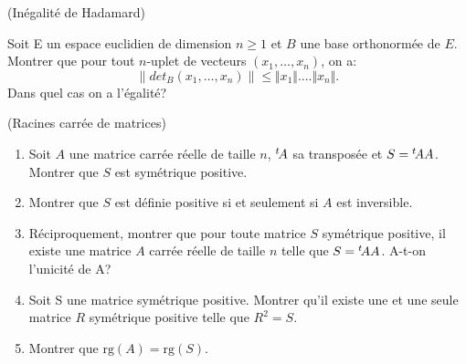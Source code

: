 \documentclass[a4paper,12pt,reqno]{amsart}
\begin{document}
\begin{exo} (Inégalité de Hadamard)

  Soit E un espace euclidien de dimension $n\geq 1$ et $B$ une base orthonormée de $E$. Montrer que pour tout $n$-uplet de vecteurs $(x_1,\ldots ,x_n)$, on a:
    $$
      \|det_B(x_1,\ldots,x_n)\|\leq \Vert x_1\Vert....\Vert x_n\Vert .
    $$
    Dans quel cas on a l'égalité?
\end{exo}

\begin{exo} (Racines carrée de matrices)
\newcommand{\transpose}[1]{\vphantom{#1}^t\!#1}
  \begin{enumerate}
    \item Soit $A$ une matrice carrée réelle de taille $n$, $\transpose{A}$ sa transposée et $S=\transpose{A}A$. Montrer que $S$ est symétrique positive.
    \item Montrer que $S$ est définie positive si et seulement si $A$ est inversible.
    \item Réciproquement, montrer que pour toute matrice $S$ symétrique positive, il existe une matrice $A$ carrée réelle de taille $n$ telle que $S=\transpose{A}A$. A-t-on l'unicité de A?
    \item Soit S une matrice symétrique positive. Montrer qu'il existe une et une seule matrice $R$ symétrique positive telle que $R^2=S$.
    \item Montrer que $\mathrm{rg}(A)=\mathrm{rg}(S)$.
  \end{enumerate}
\end{exo}
\end{document}
